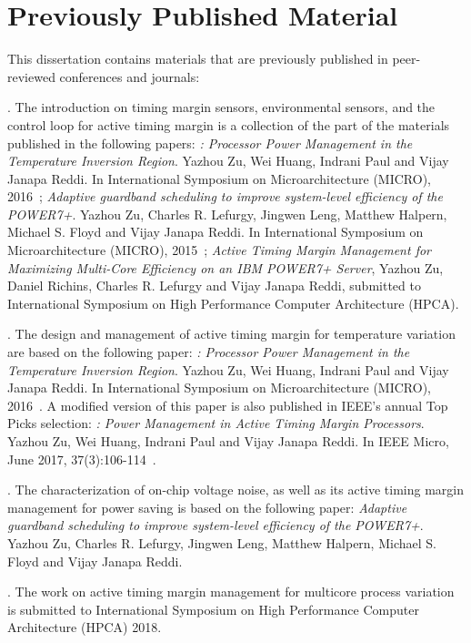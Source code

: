 \section{Previously Published Material}
\label{sec:intro:prev}

This dissertation contains materials that are previously published in peer-reviewed conferences and journals:

\textbf{}. The introduction on timing margin sensors, environmental sensors, and the control loop for active timing margin is a collection of the part of the materials published in the following papers: \textit{\tistates: Processor Power Management in the Temperature Inversion Region}. Yazhou Zu, Wei Huang, Indrani Paul and Vijay Janapa Reddi. In International Symposium on Microarchitecture (MICRO), 2016~\cite{zu2016tistate}; \textit{Adaptive guardband scheduling to improve system-level efficiency of the POWER7+}. Yazhou Zu, Charles R. Lefurgy, Jingwen Leng, Matthew Halpern, Michael S. Floyd and Vijay Janapa Reddi. In International Symposium on Microarchitecture (MICRO), 2015~\cite{zu2015adaptive}; \textit{Active Timing Margin Management for Maximizing Multi-Core Efficiency on an IBM POWER7+ Server}, Yazhou Zu, Daniel Richins, Charles R. Lefurgy and Vijay Janapa Reddi, submitted to International Symposium on High Performance Computer Architecture (HPCA).

\textbf{}. The design and management of active timing margin for temperature variation are based on the following paper: \textit{\tistates: Processor Power Management in the Temperature Inversion Region}. Yazhou Zu, Wei Huang, Indrani Paul and Vijay Janapa Reddi. In International Symposium on Microarchitecture (MICRO), 2016~\cite{zu2016tistate}. A modified version of this paper is also published in IEEE's annual Top Picks selection: \textit{\tistates: Power Management in Active Timing Margin Processors}. Yazhou Zu, Wei Huang, Indrani Paul and Vijay Janapa Reddi. In IEEE Micro, June 2017, 37(3):106-114~\cite{zu2017ti}.

\textbf{}. The characterization of on-chip voltage noise, as well as its active timing margin management for power saving is based on the following paper: \textit{Adaptive guardband scheduling to improve system-level efficiency of the POWER7+}. Yazhou Zu, Charles R. Lefurgy, Jingwen Leng, Matthew Halpern, Michael S. Floyd and Vijay Janapa Reddi. 

\textbf{}. The work on active timing margin management for multicore process variation is submitted to International Symposium on High Performance Computer Architecture (HPCA) 2018.

